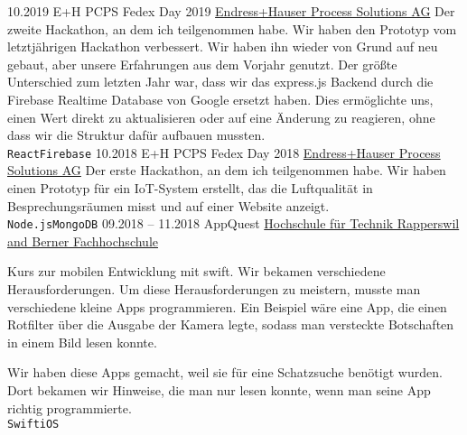 \documentclass[9pt]{developercv} %
\begin{document}
\begin{entrylist}
		{10.2019}
		{E+H PCPS Fedex Day 2019}
		{\href{https://endress.com}{Endress+Hauser Process Solutions AG}}
		{Der zweite Hackathon, an dem ich teilgenommen habe. Wir haben den Prototyp vom letztjährigen Hackathon verbessert. Wir haben ihn wieder von Grund auf neu gebaut, aber unsere Erfahrungen aus dem Vorjahr genutzt. Der größte Unterschied zum letzten Jahr war, dass wir das express.js Backend durch die Firebase Realtime Database von Google ersetzt haben. Dies ermöglichte uns, einen Wert direkt zu aktualisieren oder auf eine Änderung zu reagieren, ohne dass wir die Struktur dafür aufbauen mussten.\\ \texttt{React}\slashsep\texttt{Firebase}}
	\entry
		{10.2018}
		{E+H PCPS Fedex Day 2018}
		{\href{https://endress.com}{Endress+Hauser Process Solutions AG}}
		{Der erste Hackathon, an dem ich teilgenommen habe. Wir haben einen Prototyp für ein IoT-System erstellt, das die Luftqualität in Besprechungsräumen misst und auf einer Website anzeigt.\\ \texttt{Node.js}\slashsep\texttt{MongoDB}}
	\entry
		{09.2018 -- 11.2018}
		{AppQuest}
		{\href{https://appquest.ch/}{Hochschule für Technik Rapperswil and Berner Fachhochschule}}
		{Kurs zur mobilen Entwicklung mit swift. Wir bekamen verschiedene Herausforderungen. Um diese Herausforderungen zu meistern, musste man verschiedene kleine Apps programmieren. Ein Beispiel wäre eine App, die einen Rotfilter über die Ausgabe der Kamera legte, sodass man versteckte Botschaften in einem Bild lesen konnte.

    Wir haben diese Apps gemacht, weil sie für eine Schatzsuche benötigt wurden. Dort bekamen wir Hinweise, die man nur lesen konnte, wenn man seine App richtig programmierte.\\ \texttt{Swift}\slashsep\texttt{iOS}}
\end{entrylist}

\end{document}
